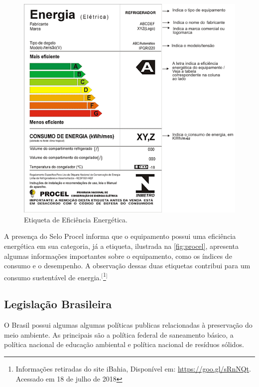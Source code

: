 \begin{figure}[htb]
	\caption{\label{fig:procel}Etiqueta de Eficiência Energética.}
	\begin{center}
	    \includegraphics[scale=0.55]{imagens/procel.png}
	\end{center}
\end{figure}

A presença do Selo Procel informa que o equipamento possui uma eficiência energética em sua categoria, já a etiqueta, ilustrada na \autoref{fig:procel}, apresenta algumas informações importantes sobre o equipamento, como os índices de consumo e o desempenho. A observação dessas duas etiquetas contribui para um consumo sustentável de energia.$^{[}$\footnote{Informações retiradas do site iBahia, Disponível em: \url{https://goo.gl/sRnNQt}. Acessado em 18 de julho de 2018}$^{]}$

\subsection{Legislação Brasileira}

O Brasil possui algumas algumas políticas publicas relacionadas à preservação do meio ambiente. As principais são a política federal de saneamento básico, a política nacional de educação ambiental e política nacional de resíduos sólidos.

